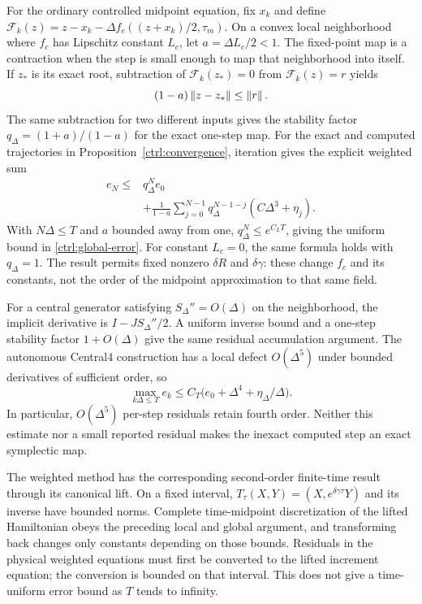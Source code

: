 For the ordinary controlled midpoint equation, fix $x_k$ and define
$\mathcal F_k(z)=z-x_k-\Delta f_c((z+x_k)/2,\tau_m)$.
On a convex local neighborhood where $f_c$ has Lipschitz constant $L_c$, let $a=\Delta L_c/2<1$. The fixed-point map is a contraction when the step is small enough to map that neighborhood into itself. If $z_*$ is its exact root, subtraction of $\mathcal F_k(z_*)=0$ from $\mathcal F_k(z)=r$ yields
\[
 (1-a)\left\lVert z-z_*\right\rVert\le\left\lVert r\right\rVert.
\]
The same subtraction for two different inputs gives the stability factor
$q_\Delta=(1+a)/(1-a)$ for the exact one-step map. For the exact and computed trajectories in Proposition~\ref{ctrl:convergence}, iteration gives the explicit weighted sum
\begin{equation}\label{ss:residual-sum}
\begin{aligned}
 e_N\le{}&q_\Delta^N e_0\\
 &+\frac{1}{1-a}\sum_{j=0}^{N-1}
       q_\Delta^{N-1-j}(C\Delta^3+\eta_j).
\end{aligned}
\end{equation}
With $N\Delta\le T$ and $a$ bounded away from one,
$q_\Delta^N\le e^{C_LT}$, giving the uniform bound in
\eqref{ctrl:global-error}. For constant $L_c=0$, the same formula holds with $q_\Delta=1$. The result permits fixed nonzero $\delta R$ and $\delta\gamma$: these change $f_c$ and its constants, not the order of the midpoint approximation to that same field.

For a central generator satisfying $S_\Delta''=O(\Delta)$ on the neighborhood, the implicit derivative is $I-JS_\Delta''/2$. A uniform inverse bound and a one-step stability factor $1+O(\Delta)$ give the same residual accumulation argument. The autonomous Central4 construction has a local defect $O(\Delta^5)$ under bounded derivatives of sufficient order, so
\[
 \max_{k\Delta\le T}e_k
       \le C_T\bigl(e_0+\Delta^4+\eta_\Delta/\Delta\bigr).
\]
In particular, $O(\Delta^5)$ per-step residuals retain fourth order. Neither this estimate nor a small reported residual makes the inexact computed step an exact symplectic map.

The weighted method has the corresponding second-order finite-time result through its canonical lift. On a fixed interval, $T_\tau(X,Y)=(X,e^{\delta\gamma\tau}Y)$ and its inverse have bounded norms. Complete time-midpoint discretization of the lifted Hamiltonian obeys the preceding local and global argument, and transforming back changes only constants depending on those bounds. Residuals in the physical weighted equations must first be converted to the lifted increment equation; the conversion is bounded on that interval. This does not give a time-uniform error bound as $T$ tends to infinity.

